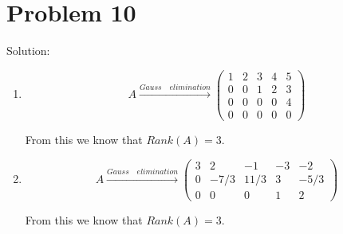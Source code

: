 \documentclass[12pt]{article}
\begin{document}
\section{Problem 10}
Solution:
\begin{enumerate}
\item
$$
A \xrightarrow {Gauss \quad elimination}
\begin{pmatrix}
1 & 2 & 3 & 4 & 5 \\
0 & 0 & 1 & 2 & 3 \\
0 & 0 & 0 & 0 & 4 \\
0 & 0 & 0 & 0 & 0
\end{pmatrix}
$$

From this we know that $Rank(A) = 3$.

\item
$$
A \xrightarrow {Gauss \quad elimination}
\begin{pmatrix}
3 & 2 & -1 & -3 & -2 \\
0 & -7/3 & 11/3 & 3 & -5/3 \\
0 & 0 & 0 & 1 & 2 
\end{pmatrix}
$$

From this we know that $Rank(A) = 3$.
\end{enumerate}
\end{document}
